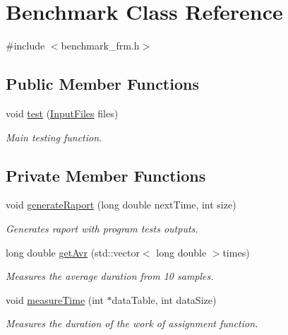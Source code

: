 \hypertarget{class_benchmark}{}\section{Benchmark Class Reference}
\label{class_benchmark}


{\ttfamily \#include $<$benchmark\+\_\+frm.\+h$>$}

\subsection*{Public Member Functions}
\begin{DoxyCompactItemize}
\item 
void \hyperlink{class_benchmark_a9d8c911b12652e87e91da87f85e6cdf7}{test} (\hyperlink{class_input_files}{Input\+Files} files)
\begin{DoxyCompactList}\small\item\em Main testing function. \end{DoxyCompactList}\end{DoxyCompactItemize}
\subsection*{Private Member Functions}
\begin{DoxyCompactItemize}
\item 
void \hyperlink{class_benchmark_a967a51b006393725fedf53119f467a16}{generate\+Raport} (long double next\+Time, int size)
\begin{DoxyCompactList}\small\item\em Generates raport with program tests outputs. \end{DoxyCompactList}\item 
long double \hyperlink{class_benchmark_a3efa1ec3d4e76eb0fa1633dda265c711}{get\+Avr} (std\+::vector$<$ long double $>$times)
\begin{DoxyCompactList}\small\item\em Measures the average duration from 10 samples. \end{DoxyCompactList}\item 
void \hyperlink{class_benchmark_a2256d13e70e2e5f0df7583118dd88d49}{measure\+Time} (int $\ast$data\+Table, int data\+Size)
\begin{DoxyCompactList}\small\item\em Measures the duration of the work of assignment function. \end{DoxyCompactList}\end{DoxyCompactItemize}

